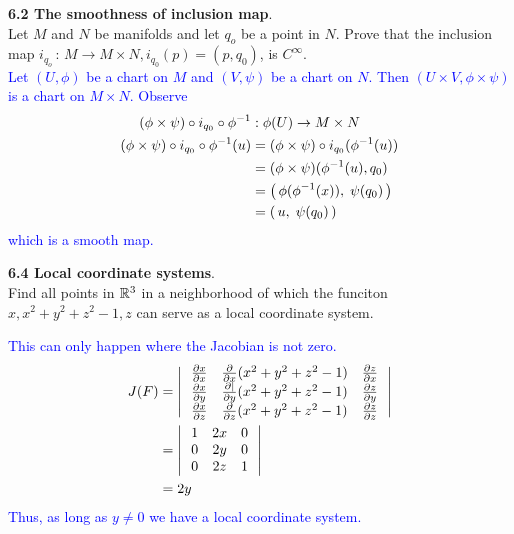 \documentclass[10pt,a4paper]{report}
\newcommand{\BLUE}[1]{\textcolor{blue}{#1}}
\begin{document}
\HLINE
\textbf{6.2 The smoothness of inclusion map}.\\


Let $M$ and $N$ be manifolds and let $q_o$ be a point in $N$.  Prove that the inclusion map $i_{q_o}\,:\, M\to M \times N, i_{q_0}(p) =(p, q_0)$, is $C^\infty$. \\

\BLUE{Let $(U, \phi)$ be a chart on $M$ and $(V, \psi)$ be a chart on $N$. Then $(U \times V, \phi \times \psi)$ is a chart on $M \times N$. Observe
\begin{align*}
	(\phi \times \psi) \circ i_{q_0} \circ \phi^{-1} &: \phi(U) \to M \times N \\
	(\phi \times \psi) \circ i_{q_0} \circ \phi^{-1}(u) &= (\phi \times \psi) \circ i_{q_0}( \phi^{-1}(u) )\\
	&= (\phi \times \psi) ( \phi^{-1}(u), q_0) \\
	&= \left (\,  \phi(\phi^{-1}(x)),\; \psi(q_0) \,\right ) \\
	&= \left (\,  u,\; \psi(q_0) \,\right )
\end{align*}which is a smooth map.
}

\newpage
\HLINE
\textbf{6.4 Local coordinate systems}.\\

Find all points in $\mathbb{R}^3$ in a neighborhood of which the funciton $x, x^2+y^2+z^2-1, z$ can serve as a local coordinate system.

\BLUE{This can only happen where the Jacobian is not zero. 
\begin{align*}
	J(F) &= \left |\,  \begin{array}{c c c} \frac{\partial x}{\partial x}&\frac{\partial }{\partial x}(x^2+y^2+z^2-1)&\frac{\partial z}{\partial x} \\ \frac{\partial x}{\partial y} & \frac{\partial |}{\partial y}(x^2+y^2+z^2-1) & \frac{\partial z}{\partial y} \\ \frac{\partial x}{\partial z} & \frac{\partial }{\partial z}(x^2+y^2+z^2-1) & \frac{\partial z}{\partial z} \end{array}  \,\right | \\
	&= \left |\,  \begin{array}{c c c} 1&2x&0 \\ 0 & 2y & 0 \\ 0 & 2z & 1 \end{array}  \,\right | \\ 
	&= 2y
\end{align*}Thus, as long as $y\ne0$ we have a local coordinate system.
}
\end{document}
